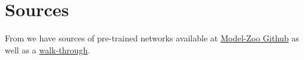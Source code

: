 \documentclass[11pt]{article}
\begin{document}
\section{Sources}

From \cite{gentle-introduction-to-transfer-learning} we have sources of pre-trained networks available at \href{https://github.com/BVLC/caffe/wiki/Model-Zoo}{Model-Zoo Github} as well as a \href{https://machinelearningmastery.com/how-to-use-transfer-learning-when-developing-convolutional-neural-network-models/}{walk-through}.

\printbibliography
\end{document}
